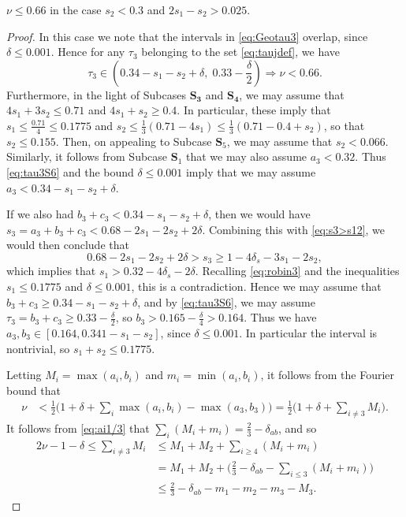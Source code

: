 \begin{lemma}\label{lem:Subcase2.6}
  \leanok
  $\nu \leq 0.66$ in the case $s_2<0.3$ and $2s_1-s_2>0.025$.
\end{lemma}
\begin{proof}
  \leanok

In this case we note that the intervals in
\eqref{eq:Geotau3}  overlap, since $\delta\leq 0.001$.
Hence for any $\tau_3$ belonging to the set \eqref{eq:taujdef}, we have
\begin{equation}\label{eq:tau3S6}
\tau_3\in
 \left(0.34-s_1-s_2+ \delta, \;
 0.33-\frac{\delta}{2}\right)
 \Longrightarrow
\nu < 0.66.
\end{equation}
Furthermore,
in the light of Subcases $\mathbf{S_3}$ and $\mathbf{S_4}$, we may assume that
 $4s_1+3s_2\leq 0.71$ and $4s_1+s_2\geq 0.4$. In particular, these imply
 that $s_1\leq  \frac{0.71}{4}\leq 0.1775$ and
  $s_2 \leq  \frac{1}{3}(0.71 - 4s_1) \leq  \frac{1}{3}(0.71-0.4+s_2)$,  so that $s_2\leq 0.155$. Then, on appealing to Subcase
 $\mathbf{S}_5$, we  may assume that $s_2< 0.066$. Similarly, it follows from Subcase $\mathbf{S}_1$ that we may also assume $a_3<0.32$. Thus  \eqref{eq:tau3S6} and the bound $\delta\leq 0.001$ imply that we may assume $a_3< 0.34-s_1-s_2+ \delta$.

If we also had  $b_3+c_3<0.34-s_1-s_2+\delta$,  then we would have $s_3 = a_3 + b_3 +c_3 < 0.68-2s_1-2s_2+2\delta$. Combining this with
 \eqref{eq:s3>s12}, we would then conclude that
$$
0.68-2s_1-2s_2+2\delta>
s_3 \ge 1-4\delta_s-3s_1-2s_2,
$$
which implies that
$s_1>0.32-4\delta_s-2\delta$.
Recalling  \eqref{eq:robin3} and the inequalities
$s_1\leq 0.1775
 $ and $\delta\leq 0.001$, this is  a contradiction.
   Hence we may assume that  $b_3+c_3\ge 0.34-s_1-s_2+ \delta$, and by \eqref{eq:tau3S6}, we may assume $\tau_3=b_3+c_3\geq  0.33-\frac{\delta}{2}$, so $b_3>0.165-\frac{\delta}{4}> 0.164$. Thus we have $a_3,b_3\in [0.164, 0.341-s_1-s_2]$,
   since $\delta\leq 0.001$.
    In particular the interval is nontrivial, so $s_1+s_2\le 0.1775$.


Letting $M_i = \max(a_i, b_i)$ and  $m_i = \min(a_i, b_i)$, it follows from  the Fourier bound that
\begin{align*}
\nu &< \frac{1}{2}\Big(1+\delta+\sum_{i}\max(a_i, b_i) - \max(a_3,b_3)\Big) = \frac{1}{2}\Big(1+\delta+\sum_{i\neq3}M_i\Big).
\end{align*}
It follows from \eqref{eq:ai1/3} that
$\sum_i (M_i+m_i)=\frac{2}{3}-\delta_{ab}$, and so
\begin{align*}
2\nu-1 -\delta\le \sum_{i\neq3}M_i
&\le M_1+M_2 + \sum_{i\ge4}(M_i+m_i)\\
&= M_1+M_2 + \Big(\frac{2}{3} - \delta_{ab} - \sum_{i\le3}(M_i+m_i)\Big)\\
& \le \frac{2}{3} - \delta_{ab} - m_1 - m_2  - m_3 - M_3.
\end{align*}



\end{proof}

